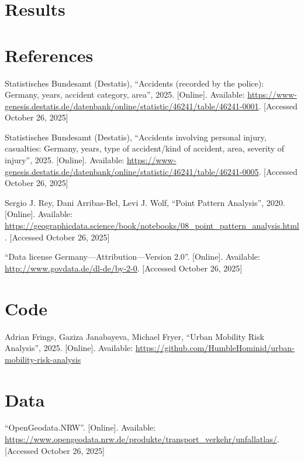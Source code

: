 \documentclass[10pt,a4paper]{article} %
\begin{document}
\section*{Results}

\section*{References}
\begin{enumerate}[label={[\arabic*]}]
    \item Statistisches Bundesamt (Destatis), ``Accidents (recorded by the police): Germany, years, accident category, area'', 2025. [Online]. Available: \url{https://www-genesis.destatis.de/datenbank/online/statistic/46241/table/46241-0001}. [Accessed October 26, 2025] %
    \item Statistisches Bundesamt (Destatis), ``Accidents involving personal injury, casualties: Germany, years, type of accident/kind of accident, area, severity of injury'', 2025. [Online]. Available: \url{https://www-genesis.destatis.de/datenbank/online/statistic/46241/table/46241-0005}. [Accessed October 26, 2025] %
    \item Sergio J. Rey, Dani Arribas-Bel, Levi J. Wolf, ``Point Pattern Analysis'', 2020. [Online]. Available: \url{https://geographicdata.science/book/notebooks/08_point_pattern_analysis.html}. [Accessed October 26, 2025]
    \item ``Data license Germany---Attribution---Version 2.0''. [Online]. Available: \url{http://www.govdata.de/dl-de/by-2-0}. [Accessed October 26, 2025] %
\end{enumerate}

\section*{Code}
\begin{enumerate}[label={[\arabic*]},start=5]
    \item Adrian Frings, Gaziza Janabayeva, Michael Fryer, ``Urban Mobility Risk Analysis'', 2025. [Online]. Available: \url{https://github.com/HumbleHominid/urban-mobility-risk-analysis}
\end{enumerate}

\section*{Data}
\begin{enumerate}[label={[\arabic*]},start=6]
    \item ``OpenGeodata.NRW''. [Online]. Available: \url{https://www.opengeodata.nrw.de/produkte/transport_verkehr/unfallatlas/}. [Accessed October 26, 2025]
\end{enumerate}

\end{document}
